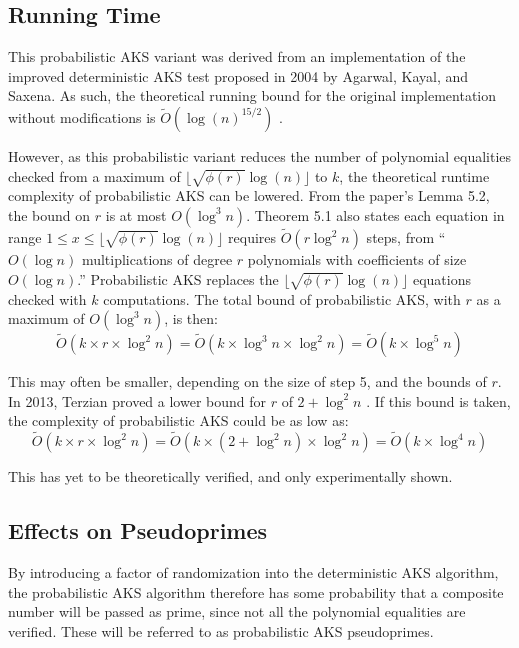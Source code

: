 \documentclass{article}
\begin{document}
\subsection{Running Time}
This probabilistic AKS variant was derived from an implementation of the improved deterministic AKS test proposed in 2004 by Agarwal, Kayal, and Saxena. As such, the theoretical running bound for the original implementation without modifications is $\widetilde{O}(\log(n)^{15/2})$ \cite{agrawal_primes_2004}.

However, as this probabilistic variant reduces the number of polynomial equalities checked from a maximum of $\lfloor \sqrt{\phi(r)}\log(n) \rfloor$ to $k$, the theoretical runtime complexity of probabilistic AKS can be lowered. From the paper's Lemma 5.2, the bound on $r$ is at most $O(\log^3{n})$. Theorem 5.1 also states each equation in range $1 \leq x \leq \lfloor \sqrt{\phi(r)}\log(n) \rfloor$ requires $\widetilde{O}(r \log^2{n})$ steps, from ``$O(\log{n})$ multiplications of degree $r$ polynomials with coefficients of size $O(\log{n})$.'' \cite{agrawal_primes_2004} Probabilistic AKS replaces the $\lfloor \sqrt{\phi(r)}\log(n) \rfloor$ equations checked with $k$ computations. The total bound of probabilistic AKS, with $r$ as a maximum of $O(\log^3{n})$, is then:
\[\widetilde{O}(k \times r \times \log^2{n}) = \widetilde{O}(k \times \log^3{n} \times \log^2{n}) = \widetilde{O}(k \times \log^5{n})\]

This may often be smaller, depending on the size of step 5, and the bounds of $r$. In 2013, Terzian proved a lower bound for $r$ of $2 + \log^2{n}$ \cite{terzian_aks_2013}. If this bound is taken, the complexity of probabilistic AKS could be as low as:
\[\widetilde{O}(k \times r \times \log^2{n}) = \widetilde{O}(k \times (2 + \log^2{n}) \times \log^2{n}) = \widetilde{O}(k \times \log^4{n})\]

This has yet to be theoretically verified, and only experimentally shown.

\subsection{Effects on Pseudoprimes}
By introducing a factor of randomization into the deterministic AKS algorithm, the probabilistic AKS algorithm therefore has some probability that a composite number will be passed as prime, since not all the polynomial equalities are verified. These will be referred to as probabilistic AKS pseudoprimes.
\end{document}
